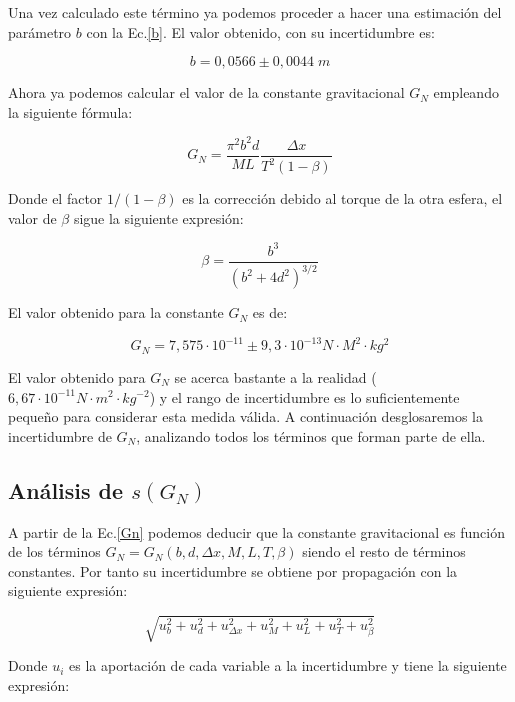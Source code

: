 \documentclass[a4paper,12pt,titlepage]{article}
\begin{document}
Una vez calculado este término ya podemos proceder a hacer una estimación del parámetro $b$ con la Ec.\ref{b}. El valor obtenido, con su incertidumbre es:

\begin{equation}
    b = 0,0566 \pm 0,0044 \;m
\end{equation}

Ahora ya podemos calcular el valor de la constante gravitacional $G_N$ empleando la siguiente fórmula:

\begin{equation}
    G_N = \frac{\pi^2b^2d}{ML}\frac{\Delta x}{T^2(1-\beta)}
    \label{Gn}
\end{equation}

Donde el factor $1/(1-\beta)$ es la corrección debido al torque de la otra esfera, el valor de $\beta$ sigue la siguiente expresión:

\begin{equation}
    \beta = \frac{b^3}{(b^2+4d^2)^{3/2}}
\end{equation}

El valor obtenido para la constante $G_N$ es de:

\begin{equation}
    G_N = 7,575 \cdot 10^{-11} \pm 9,3\cdot 10^{-13} N \cdot M^2 \cdot kg^2
\end{equation}

El valor obtenido para $G_N$ se acerca bastante a la realidad ($6,67\cdot 10^{-11}N\cdot m^2 \cdot kg^{-2}$) y el rango de incertidumbre es lo suficientemente pequeño para considerar esta medida válida. A continuación desglosaremos la incertidumbre de $G_N$, analizando todos los términos que forman parte de ella.

\subsection{Análisis de $s(G_N)$}

A partir de la Ec.\ref{Gn} podemos deducir que la constante gravitacional es función de los términos $G_N=G_N(b,d,\Delta x,M,L,T,\beta)$ siendo el resto de términos constantes. Por tanto su incertidumbre se obtiene por propagación con la siguiente expresión:

\begin{equation}
    \sqrt{u_b^2+u_d^2+u_{\Delta x}^2+u_M^2+u_L^2+u_T^2+u_\beta^2}
\end{equation}

Donde $u_{i}$ es la aportación de cada variable a la incertidumbre y tiene la siguiente expresión:
\end{document}
